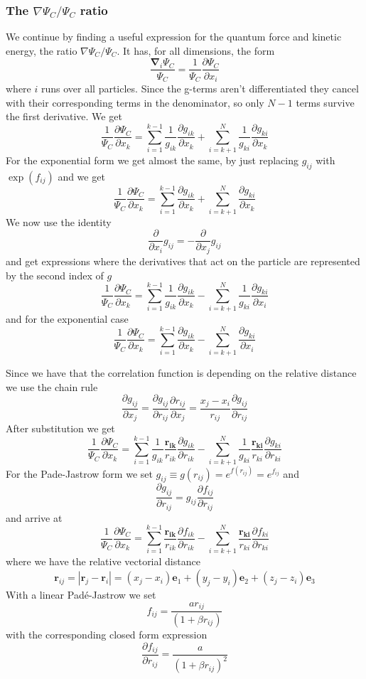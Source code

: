 \documentclass[11pt]{article}
\begin{document}
	\subsubsection{The $\nabla \Psi_{C}/\Psi_{C}$ ratio}
		We continue by finding a useful expression for the quantum force and kinetic energy, the ratio $\nabla\Psi_{C}/\Psi_{C}$. It has,
		for all dimensions, the form
		\[
		\frac{\mathbf{\nabla}_{i}\Psi_{C}}{\Psi_{C}}=\frac{1}{\Psi_{C}}\frac{\partial\Psi_{C}}{\partial x_{i}}
		\]
		where $i$ runs over all particles. Since the g-terms aren't differentiated
		they cancel with their corresponding terms in the denominator, so
		only $N-1$ terms survive the first derivative. We get
		\[
		\frac{1}{\Psi_{C}}\frac{\partial\Psi_{C}}{\partial x_{k}}=\sum_{i=1}^{k-1}\frac{1}{g_{ik}}\frac{\partial g_{ik}}{\partial x_{k}}+\sum_{i=k+1}^{N}\frac{1}{g_{ki}}\frac{\partial g_{ki}}{\partial x_{k}}
		\]
		For the exponential form we get almost the same, by just replacing
		$g_{ij}$ with $\exp\left(f_{ij}\right)$ and we get
		\[
		\frac{1}{\Psi_{C}}\frac{\partial\Psi_{C}}{\partial x_{k}}=\sum_{i=1}^{k-1}\frac{\partial g_{ik}}{\partial x_{k}}+\sum_{i=k+1}^{N}\frac{\partial g_{ki}}{\partial x_{k}}
		\]
		We now use the identity
		\[
		\frac{\partial}{\partial x_{i}}g_{ij}=-\frac{\partial}{\partial x_{j}}g_{ij}
		\]
		and get expressions where the derivatives that act on the particle
		are represented by the second index of $g$
		\[
		\frac{1}{\Psi_{C}}\frac{\partial\Psi_{C}}{\partial x_{k}}=\sum_{i=1}^{k-1}\frac{1}{g_{ik}}\frac{\partial g_{ik}}{\partial x_{k}}-\sum_{i=k+1}^{N}\frac{1}{g_{ki}}\frac{\partial g_{ki}}{\partial x_{i}}
		\]
		and for the exponential case
		\[
		\frac{1}{\Psi_{C}}\frac{\partial\Psi_{C}}{\partial x_{k}}=\sum_{i=1}^{k-1}\frac{\partial g_{ik}}{\partial x_{k}}-\sum_{i=k+1}^{N}\frac{\partial g_{ki}}{\partial x_{i}}
		\]


		Since we have that the correlation function is depending on the relative
		distance we use the chain rule
		\[
		\frac{\partial g_{ij}}{\partial x_{j}}=\frac{\partial g_{ij}}{\partial r_{ij}}\frac{\partial r_{ij}}{\partial x_{j}}=\frac{x_{j}-x_{i}}{r_{ij}}\frac{\partial g_{ij}}{\partial r_{ij}}
		\]
		 After substitution we get
		\[
		\frac{1}{\Psi_{C}}\frac{\partial\Psi_{C}}{\partial x_{k}}=\sum_{i=1}^{k-1}\frac{1}{g_{ik}}\frac{\mathbf{r_{ik}}}{r_{ik}}\frac{\partial g_{ik}}{\partial r_{ik}}-\sum_{i=k+1}^{N}\frac{1}{g_{ki}}\frac{\mathbf{r_{ki}}}{r_{ki}}\frac{\partial g_{ki}}{\partial r_{ki}}
		\]
		For the Pade-Jastrow form we set $\ensuremath{g_{ij}\equiv g(r_{ij})=e^{f(r_{ij})}=e^{f_{ij}}}$
		and 
		\[
		\frac{\partial g_{ij}}{\partial r_{ij}}=g_{ij}\frac{\partial f_{ij}}{\partial r_{ij}}
		\]
		and arrive at 
		\[
		\frac{1}{\Psi_{C}}\frac{\partial\Psi_{C}}{\partial x_{k}}=\sum_{i=1}^{k-1}\frac{\mathbf{r_{ik}}}{r_{ik}}\frac{\partial f_{ik}}{\partial r_{ik}}-\sum_{i=k+1}^{N}\frac{\mathbf{r_{ki}}}{r_{ki}}\frac{\partial f_{ki}}{\partial r_{ki}}
		\]
		where we have the relative vectorial distance 
		\[
		\mathbf{r}_{ij}=|\mathbf{r}_{j}-\mathbf{r}_{i}|=(x_{j}-x_{i})\mathbf{e}_{1}+(y_{j}-y_{i})\mathbf{e}_{2}+(z_{j}-z_{i})\mathbf{e}_{3}
		\]
		With a linear Padé-Jastrow we set
		\[
		f_{ij}=\frac{ar_{ij}}{(1+\beta r_{ij})}
		\]
		with the corresponding closed form expression
		\[
		\frac{\partial f_{ij}}{\partial r_{ij}}=\frac{a}{(1+\beta r_{ij})^{2}}
		\]
\end{document}
